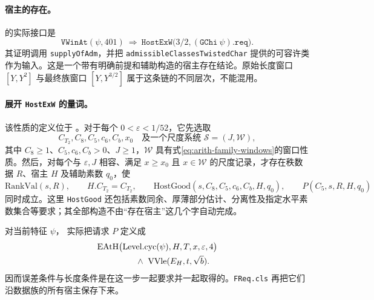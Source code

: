 \documentclass[UTF8,fontset=fandol,a4paper,openany,oneside]{ctexbook}
\theoremstyle{definition}
\theoremstyle{remark}
\begin{document}
\paragraph{宿主的存在。}
 的实际接口是
\[
\texttt{VWinAt}(\psi,401)
\ \Longrightarrow\
\texttt{HostExW}\bigl(3/2,(\texttt{GChi}\ \psi).\texttt{req}\bigr).
\]
其证明调用 \texttt{supplyOfAdm}，并把 \texttt{admissibleClassesTwistedChar} 提供的可容许类作为输入。这是一个带有明确前提和辅助构造的宿主存在结论。原始长度窗口 $[Y,Y^2]$ 与最终族窗口 $[Y,Y^{3/2}]$ 属于这条链的不同层次，不能混用。

\paragraph{展开 \texttt{HostExW} 的量词。}
该性质的定义位于 。对于每个 $0<\varepsilon<1/52$，它先选取
\[
C_{T_2},C_8,C_5,c_6,C_b,x_0
\quad\text{及一个尺度系统 }\mathcal S=(J,\mathcal W),
\]
其中 $C_8\ge1$、$C_5,c_6,C_b>0$、$J\ge1$，$\mathcal W$ 具有式\eqref{eq:arith-family-windows}的窗口性质。然后，对每个与 $\varepsilon,J$ 相容、满足 $x\ge x_0$ 且 $x\in\mathcal W$ 的尺度记录，才存在秩数据 $R$、宿主 $H$ 及辅助素数 $q_0$，使
\[
\mathrm{RankVal}(s,R),\qquad
H.C_{T_2}=C_{T_2},\qquad
\mathrm{HostGood}(s,C_8,C_5,c_6,C_b,H,q_0),\qquad P(C_5,s,R,H,q_0)
\]
同时成立。这里 \texttt{HostGood} 还包括素数同余、厚薄部分估计、分离性及指定水平素数集合等要求；其全部构造不由“存在宿主”这几个字自动完成。

对当前特征 $\psi$， 实际把请求 $P$ 定义成
\begin{equation}
\begin{split}
&\mathrm{EAtH}\bigl(\mathrm{Level.cyc}(\psi),H,T,x,\varepsilon,4\bigr)\\
&\hspace{16mm}\land\ \mathrm{VVle}(E_H,t,\sqrt b).
\end{split}
\label{eq:arith-gchi-request}
\end{equation}
因而误差条件与长度条件是在这一步一起要求并一起取得的。\texttt{FReq.cls} 再把它们沿数据族的所有宿主保存下来。
\end{document}
